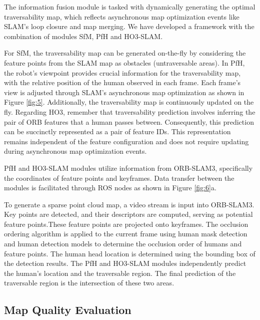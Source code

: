 \documentclass[letterpaper, 10 pt, conference]{ieeeconf}
\begin{document}
The information fusion module is tasked with dynamically generating the optimal traversability map, which reflects asynchronous map optimization events like SLAM's loop closure and map merging. We have developed a framework with the combination of modules SfM, PfH and HO3-SLAM.

For SfM, the traversability map can be generated on-the-fly by considering the feature points from the SLAM map as obstacles (untraversable areas). In PfH, the robot's viewpoint provides crucial information for the traversability map, with the relative position of the human observed in each frame. Each frame's view is adjusted through SLAM's asynchronous map optimization as shown in Figure \ref{fig:5}. Additionally, the traversability map is continuously updated on the fly. Regarding HO3, remember that traversability prediction involves inferring the pair of ORB features that a human passes between. Consequently, this prediction can be succinctly represented as a pair of feature IDs. This representation remains independent of the feature configuration and does not require updating during asynchronous map optimization events.

\figD

PfH and HO3-SLAM\cite{r19} modules utilize information from ORB-SLAM3\cite{r36}, specifically the coordinates of feature points and keyframes. Data transfer between the modules is facilitated through ROS nodes as shown in Figure \ref{fig:6}a.


To generate a sparse point cloud map, a video stream is input into ORB-SLAM3. Key points are detected, and their descriptors are computed, serving as potential feature points.These feature points are projected onto keyframes. The occlusion ordering algorithm is applied to the current frame using human mask detection and human detection models to determine the occlusion order of humans and feature points. The human head location is determined using the bounding box of the detection results. The PfH and HO3-SLAM modules independently predict the human's location and the traversable region. The final prediction of the traversable region is the intersection of these two areas.

\subsection{Map Quality Evaluation}\label{sec:F}
\end{document}
